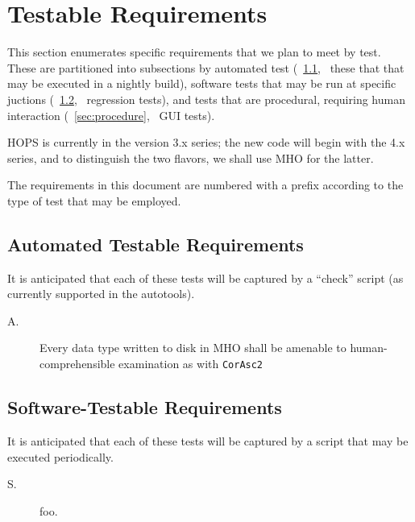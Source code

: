 %
%
\section{Testable Requirements}
\label{sec:testable}

This section enumerates specific requirements that we plan to meet by test.
These are partitioned into subsections by automated test
(\Sec~\ref{sec:auto}, \ie~these that that may be executed
in a nightly build), software tests that may be run at specific
juctions (\Sec~\ref{sec:regress}, \ie~regression tests),
and tests that are procedural, requiring human interaction
(\Sec~\ref{sec:procedure}, \ie~\ac{GUI} tests).%

\ac{HOPS} is currently in the version 3.x series; the new code will
begin with the 4.x series, and to distinguish the two flavors, we
shall use \ac{MHO} for the latter.

The requirements in this document are numbered with a prefix
according to the type of test that may be employed.

\subsection{Automated Testable Requirements}
\label{sec:auto}

It is anticipated that each of these tests will be captured by a
``check'' script (as currently supported in the autotools).

\begin{description}
\item[A.\thereq] Every data type written to disk in \ac{MHO} shall be 
amenable to human-comprehensible examination as with \texttt{\ac{CorAsc2}}
\end{description}

\subsection{Software-Testable Requirements}
\label{sec:regress}

It is anticipated that each of these tests will be captured by a
script that may be executed periodically.

\begin{description}
\item[S.\thereq] foo.
\end{description}

